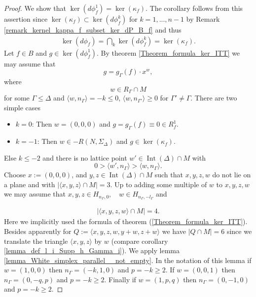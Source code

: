\documentclass[12pt, english]{article}
\DeclareMathOperator{\Int}{Int}
\begin{document}
\begin{proof}
	We show that $\ker(d \phi_f^1) = \ker(\kappa_f)$. The corollary follows from this assertion since $\ker(\kappa_f) \subset \ker(d \phi_f^k)$ for $k=1,...,n-1$ by Remark \ref{remark_kernel_kappa_f_subset_ker_dP_B_f} and thus
	\begin{align*}
		\ker(d \phi_f) = \bigcap\limits_{k} \ker(d \phi_f^k) = \ker(\kappa_f).
	\end{align*}
	Let $f \in B$ and $g \in \ker(d \phi_{f}^1)$. By theorem \ref{Theorem_formula_ker_ITT} we may assume that 
	\[ g = g_{\Gamma}(f) \cdot x^w,  \]
	where
	\[ w \in R_{\Gamma} \cap M  \]
	for some $\Gamma \leq \Delta$ and $\langle w,n_{\Gamma} \rangle = -k \leq 0$, $\langle w, n_{\Gamma'} \rangle \geq 0$ for $\Gamma' \neq \Gamma$. There are two simple cases	\begin{itemize}
		\item $k = 0$:   Then $w = (0,0,0)$ and $g = g_{\Gamma}(f) \equiv 0 \in R_{f}^1$.
		\item $k = -1$:   Then $w \in -R(N,\Sigma_{\Delta})$ and $g \in \ker(\kappa_{f})$.
	\end{itemize}
	Else $k \leq -2$ and there is no lattice point $w' \in \Int(\Delta) \cap M$ with
	\[ 0 > \langle w', n_{\Gamma} \rangle > \langle w, n_{\Gamma} \rangle.  \]
	Choose $x:= (0,0,0)$, and $y,z \in \Int(\Delta) \cap M$ such that $x,y,z,w$ do not lie on a plane and with $| \langle x,y,z \rangle \cap M| = 3$. Up to adding some multiple of $w$ to $x,y,z,w$ we may assume that $x,y,z \in H_{n_{\Gamma},0}, \quad w \in H_{n_{\Gamma},-l_{\Gamma}}$ and
	
	\begin{align*}
		| \langle x,y,z,w \rangle \cap M | = 4.
	\end{align*}
	Here we implicitly used the formula of theorem (\ref{Theorem_formula_ker_ITT}). Besides apparently for $Q:= \langle x,y,z,w,y+w,z+w \rangle$ we have $|Q \cap M| = 6$ since we translate the triangle $\langle x,y,z \rangle$ by $w$ (compare corollary \ref{lemma_def_l_i_Supp_h_Gamma_i}). We apply lemma \ref{lemma_White_simplex_parallel__not_empty}. In the notation of this lemma if {\bf $w = (1,0,0)$} then $n_{\Gamma} = (-k,1,0)$ and $p=-k \geq 2$. If $w = (0,0,1)$ then $n_{\Gamma} = (0,-q,p)$ and $p = -k \geq 2$. Finally if $w= (1,p,q)$ then $n_{\Gamma} = (0,-1,0)$ and $p = -k \geq 2$.


\end{proof}
\end{document}
